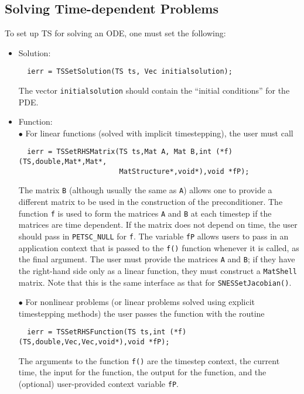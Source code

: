 \subsection{Solving Time-dependent Problems}
To set up TS for solving an ODE, one must set the following:

\begin{itemize}
\item Solution:\\
\begin{verbatim}
  ierr = TSSetSolution(TS ts, Vec initialsolution);
\end{verbatim}
The vector {\tt initialsolution} should contain the ``initial conditions''
for the PDE. 

\item Function: \\
\subitem $\bullet$ For linear functions (solved with implicit timestepping),
 the user must call 
\begin{verbatim}
  ierr = TSSetRHSMatrix(TS ts,Mat A, Mat B,int (*f)(TS,double,Mat*,Mat*,
                        MatStructure*,void*),void *fP);
\end{verbatim}
The matrix {\tt B} (although usually the same as {\tt A}) allows one to 
provide 
a different matrix to be used in the construction of the preconditioner.
The function {\tt f} is used to form the matrices {\tt A} and {\tt B} 
at each timestep if the matrices are time dependent.
If the matrix does not depend on time, the user should 
pass in {\tt PETSC\_NULL} for {\tt f}.  The variable {\tt fP} allows 
users to pass in an application context that is passed to the {\tt f()} function 
whenever it is called, as the final argument. The user must provide the matrices
{\tt A} and {\tt B}; if they have the right-hand side only as a linear
function, they must construct a {\tt MatShell} matrix. Note that this is 
the same interface as that for {\tt SNESSetJacobian()}. 

\subitem $\bullet$  For nonlinear problems (or linear problems solved using
explicit timestepping methods) the user  passes the function with 
the routine

\begin{verbatim}
  ierr = TSSetRHSFunction(TS ts,int (*f)(TS,double,Vec,Vec,void*),void *fP);
\end{verbatim}
The  arguments to the function {\tt f()} are
the timestep context, the current time, the input for the function,
the output for the function, and the (optional) user-provided context
variable {\tt fP}.


\end{itemize}
